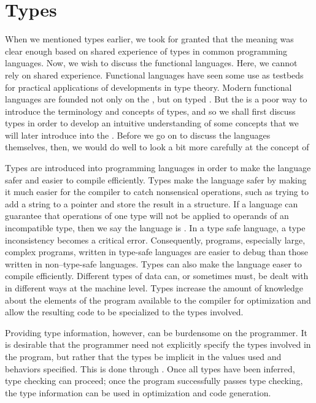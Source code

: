 \section{Types}
When we mentioned types earlier, we took for granted that the meaning was clear enough based on shared experience of types in common programming languages. Now, we wish to discuss the functional languages. Here, we cannot rely on shared experience. Functional languages have seen some use as testbeds for practical applications of developments in type theory. Modern functional languages are founded not only on the \lambdacalc{}, but on typed \lambdacalcs{}. But the \lambdacalc is a poor way to introduce the terminology and concepts of types, and so we shall first discuss types in order to develop an intuitive understanding of some concepts that we will later introduce into the \lambdacalc{}. Before we go on to discuss the languages themselves, then, we would do well to look a bit more carefully at the concept of 

Types are introduced into programming languages in order to make the language safer and easier to compile efficiently. Types make the language safer by making it much easier for the compiler to catch nonsensical operations, such as trying to add a string to a pointer and store the result in a structure. If a language can guarantee that operations of one type will not be applied to operands of an incompatible type, then we say the language is . In a type safe language, a type inconsistency becomes a critical error. Consequently, programs, especially large, complex programs, written in type-safe languages are easier to debug than those written in non--type-safe languages. Types can also make the language easer to compile efficiently. Different types of data can, or sometimes must, be dealt with in different ways at the machine level. Types increase the amount of knowledge about the elements of the program available to the compiler for optimization and allow the resulting code to be specialized to the types involved.

Providing type information, however, can be burdensome on the programmer. It is desirable that the programmer need not explicitly specify the types involved in the program, but rather that the types be implicit in the values used and behaviors specified. This is done through . Once all types have been inferred, type checking can proceed; once the program successfully passes type checking, the type information can be used in optimization and code generation.

